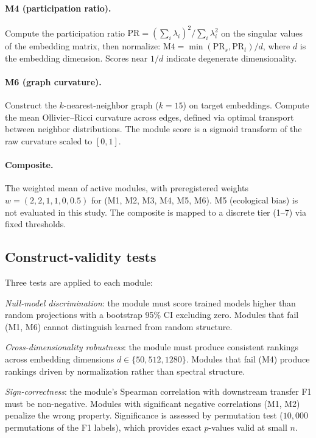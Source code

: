\documentclass[9pt,lineno]{elife}
\begin{document}
\paragraph{M4 (participation ratio).} Compute the participation ratio $\text{PR} = (\sum_i \lambda_i)^2 / \sum_i \lambda_i^2$ on the singular values of the embedding matrix, then normalize: $\text{M4} = \min(\text{PR}_s, \text{PR}_t) / d$, where $d$ is the embedding dimension. Scores near $1/d$ indicate degenerate dimensionality.

\paragraph{M6 (graph curvature).} Construct the $k$-nearest-neighbor graph ($k = 15$) on target embeddings. Compute the mean Ollivier--Ricci curvature across edges, defined via optimal transport between neighbor distributions. The module score is a sigmoid transform of the raw curvature scaled to $[0, 1]$.

\paragraph{Composite.} The weighted mean of active modules, with preregistered weights $w = (2, 2, 1, 1, 0, 0.5)$ for (M1, M2, M3, M4, M5, M6). M5 (ecological bias) is not evaluated in this study. The composite is mapped to a discrete tier (1--7) via fixed thresholds.

\subsection{Construct-validity tests}

Three tests are applied to each module:

\emph{Null-model discrimination}: the module must score trained models higher than random projections with a bootstrap 95\% CI excluding zero. Modules that fail (M1, M6) cannot distinguish learned from random structure.

\emph{Cross-dimensionality robustness}: the module must produce consistent rankings across embedding dimensions $d \in \{50, 512, 1280\}$. Modules that fail (M4) produce rankings driven by normalization rather than spectral structure.

\emph{Sign-correctness}: the module's Spearman correlation with downstream transfer F1 must be non-negative. Modules with significant negative correlations (M1, M2) penalize the wrong property. Significance is assessed by permutation test ($10{,}000$ permutations of the F1 labels), which provides exact $p$-values valid at small $n$.
\end{document}
